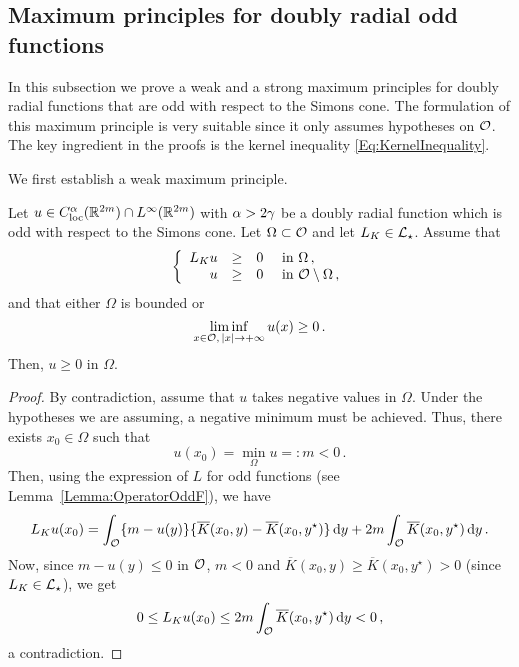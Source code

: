 \subsection{Maximum principles for doubly radial odd functions}

In this subsection we prove a weak and a strong maximum principles for doubly radial functions that are odd with respect to the Simons cone. The formulation of this maximum principle is very suitable since it only assumes hypotheses on $\mathcal{O}$. The key ingredient in the proofs is the kernel inequality \eqref{Eq:KernelInequality}.


We first establish a weak maximum principle.

\begin{proposition}
\label{Prop:WeakMaximumPrincipleForOddFunctions} Let $u\in C^{\alpha}_{\mathrm{loc}}(\mathbb{R}^{2m})\cap L^\infty(\mathbb{R}^{2m})$ with $\alpha > 2\gamma$ be a doubly radial function which is odd with respect to the Simons cone. Let $\Omega \subset \mathcal{O}$ and let $L_K  \in \mathcal{L}_\star$. Assume that
$$
\left\{\begin{array}{rcll}
L_K u & \geq & 0 & \text{ in } \Omega\,,\\
u & \geq & 0 & \text{ in } \mathcal{O} \setminus \Omega\,,
\end{array} \right.
$$
and that either $\Omega$ is bounded or 
$$
\liminf_{x \in \mathcal{O},\,|x|\to +\infty} u(x) \geq 0\,.
$$
Then, $u \geq 0$ in $\Omega$.
\end{proposition}

\begin{proof}
By contradiction, assume that $u$ takes negative values in $\Omega$. Under the hypotheses we are assuming, a negative minimum must be achieved. Thus, there exists $x_0\in \Omega$ such that
$$
u(x_0) = \min_{\Omega} u =: m < 0\,.
$$
Then, using the expression of $L$ for odd functions (see Lemma~\ref{Lemma:OperatorOddF}), we have
$$
L_K u (x_0) = \int_{\mathcal{O}} \{m - u(y) \} \{\overline{K}(x_0, y) - \overline{K}(x_0, y^\star)  \} \,\mathrm{d} y +  2 m \int_{\mathcal{O}} \overline{K}(x_0, y^\star) \,\mathrm{d} y\,.
$$
Now, since $m - u(y) \leq 0$ in $\mathcal{O}$, $m<0$ and $\overline{K}(x_0, y) \geq \overline{K}(x_0, y^\star)>0$ (since $L_K\in \mathcal{L}_\star$), we get
$$
0 \leq L_K  u(x_0) \leq 2m \int_{\mathcal{O}} \overline{K}(x_0, y^\star) \,\mathrm{d} y < 0\,,
$$
a contradiction.
\end{proof}

